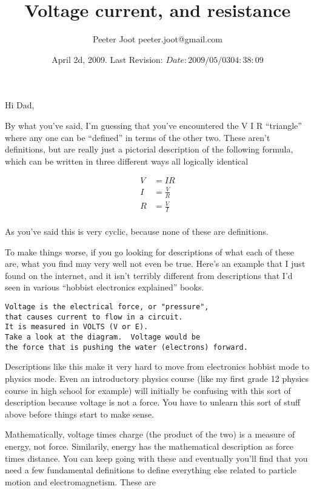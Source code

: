 \documentclass{article}
\title{ Voltage current, and resistance }
\author{Peeter Joot \quad peeter.joot@gmail.com }
\date{ April 2d, 2009.  Last Revision: $Date: 2009/05/03 04:38:09 $ }
\begin{document}
\maketitle{}

Hi Dad,

By what you've said, I'm guessing that you've encountered the V I R ``triangle'' where any one can be ``defined'' in terms of the other two.
These aren't definitions, but are really
just a pictorial description of the following formula, which can be written in three different ways all logically identical

\begin{align*}
V &= I R \\
I &= \frac{V}{R} \\
R &= \frac{V}{I} \\
\end{align*}

As you've said this is very cyclic, because none of these are definitions.

To make things worse, if you go looking for descriptions of what each of these are, what you find may very well not even be true.
Here's an example that I just found on the internet, and it isn't terribly different from descriptions that I'd seen in various
``hobbist electronics explained'' books.

\begin{lstlisting}
Voltage is the electrical force, or "pressure",
that causes current to flow in a circuit.
It is measured in VOLTS (V or E). 
Take a look at the diagram.  Voltage would be
the force that is pushing the water (electrons) forward.
\end{lstlisting}

Descriptions like this make it very hard to move from electronics hobbist mode to physics mode.  Even an introductory
physics course (like my first grade 12 physics course in high school for example) will initially be confusing with this sort of description because voltage is not a force.  You have to unlearn this sort of stuff above before things start to make sense.

Mathematically, voltage times charge (the product of the two) is a measure of energy, not force.
Similarily, energy has the mathematical description as force times distance.  You can keep going with these and
eventually you'll find that you need a few fundamental definitions to define everything else related to particle motion 
and electromagnetism.  These are
\end{document}
